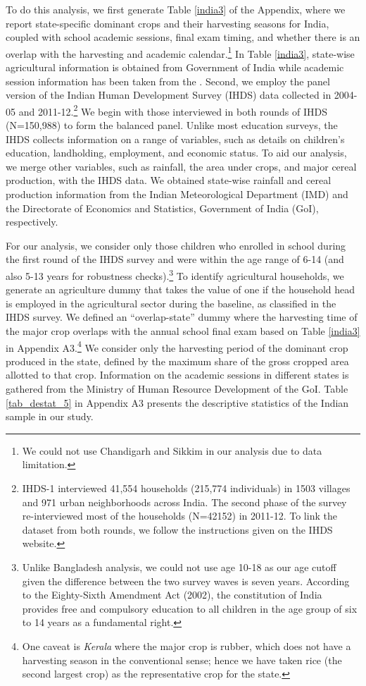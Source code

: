 \documentclass[12pt,letterpaper]{article}\usepackage[margin=1in]{geometry}
\newcommand{\0}{\ensuremath{\mbox{\boldmath $0$}}}
\begin{document}
To do this analysis, we first generate Table \ref{india3} of the Appendix, where we report state-specific dominant crops and their harvesting seasons for India, coupled with school academic sessions, final exam timing, and whether there is an overlap with the harvesting and academic calendar.\footnote{We could not use Chandigarh and Sikkim in our analysis due to data limitation.} In Table \ref{india3}, state-wise agricultural information is obtained from Government of India \citep{doac2017agricultural} while academic session information has been taken from the \cite{doac2011education}. Second, we employ the panel version of the Indian Human Development Survey (IHDS) data collected in 2004-05 and 2011-12.\footnote{IHDS-1 interviewed 41,554 households (215,774 individuals) in 1503 villages and 971 urban neighborhoods across India. The second phase of the survey re-interviewed most of the households (N=42152) in 2011-12. To link the dataset from both rounds, we follow the instructions given on the IHDS website.} We begin with those interviewed in both rounds of IHDS (N=150,988) to form the balanced panel. Unlike most education surveys, the IHDS collects information on a range of variables, such as details on children's education, landholding, employment, and economic status. To aid our analysis, we merge other variables, such as rainfall, the area under crops, and major cereal production, with the IHDS data. We obtained state-wise rainfall and cereal production information from the Indian Meteorological Department (IMD) and the Directorate of Economics and Statistics, Government of India (GoI), respectively.

For our analysis, we consider only those children who enrolled in school during the first round of the IHDS survey and were within the age range of 6-14 (and also 5-13 years for robustness checks).\footnote{Unlike Bangladesh analysis, we could not use age 10-18 as our age cutoff given the difference between the two survey waves is seven years. According to the Eighty-Sixth Amendment Act (2002), the constitution of India provides free and compulsory education to all children in the age group of six to 14 years as a fundamental right.} To identify agricultural households, we generate an agriculture dummy that takes the value of one if the household head is employed in the agricultural sector during the baseline, as classified in the IHDS survey.  We defined an ``overlap-state'' dummy where the harvesting time of the major crop overlaps with the annual school final exam based on Table \ref{india3} in Appendix A3.\footnote{One caveat is \textit{Kerala} where the major crop is rubber, which does not have a harvesting season in the conventional sense; hence we have taken rice (the second largest crop) as the representative crop for the state.} We consider only the harvesting period of the dominant crop produced in the state, defined by the maximum share of the gross cropped area allotted to that crop. Information on the academic sessions in different states is gathered from the Ministry of Human Resource Development of the GoI. Table \ref{tab_destat_5} in Appendix A3 presents the descriptive statistics of the Indian sample in our study.
\end{document}
